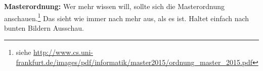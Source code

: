 \textbf{Masterordnung:} Wer mehr wissen will, sollte sich die Masterordnung anschauen.\footnote{siehe \url{http://www.cs.uni-frankfurt.de/images/pdf/informatik/master2015/ordnung_master_2015.pdf}} Das sieht wie immer nach mehr aus, als es ist. Haltet einfach nach bunten Bildern Ausschau.

\spaltenende
